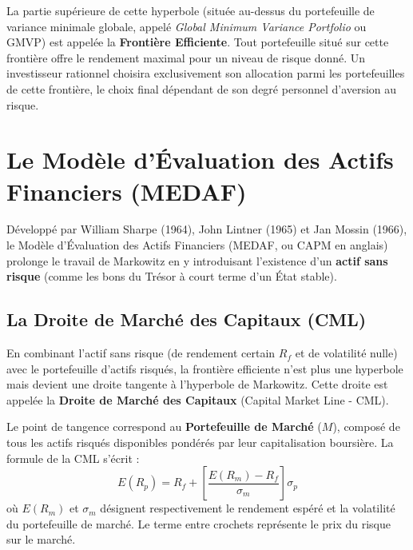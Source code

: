 La partie supérieure de cette hyperbole (située au-dessus du portefeuille de variance minimale globale, appelé \textit{Global Minimum Variance Portfolio} ou GMVP) est appelée la \textbf{Frontière Efficiente}. Tout portefeuille situé sur cette frontière offre le rendement maximal pour un niveau de risque donné. Un investisseur rationnel choisira exclusivement son allocation parmi les portefeuilles de cette frontière, le choix final dépendant de son degré personnel d'aversion au risque.

\section{Le Modèle d'Évaluation des Actifs Financiers (MEDAF)}
Développé par William Sharpe (1964), John Lintner (1965) et Jan Mossin (1966), le Modèle d'Évaluation des Actifs Financiers (MEDAF, ou CAPM en anglais) prolonge le travail de Markowitz en y introduisant l'existence d'un \textbf{actif sans risque} (comme les bons du Trésor à court terme d'un État stable).

\subsection{La Droite de Marché des Capitaux (CML)}
En combinant l'actif sans risque (de rendement certain $R_f$ et de volatilité nulle) avec le portefeuille d'actifs risqués, la frontière efficiente n'est plus une hyperbole mais devient une droite tangente à l'hyperbole de Markowitz. Cette droite est appelée la \textbf{Droite de Marché des Capitaux} (Capital Market Line - CML).

Le point de tangence correspond au \textbf{Portefeuille de Marché} ($M$), composé de tous les actifs risqués disponibles pondérés par leur capitalisation boursière. La formule de la CML s'écrit :
\begin{equation}
    E(R_p) = R_f + \left[ \frac{E(R_m) - R_f}{\sigma_m} \right] \sigma_p
\end{equation}
où $E(R_m)$ et $\sigma_m$ désignent respectivement le rendement espéré et la volatilité du portefeuille de marché. Le terme entre crochets représente le prix du risque sur le marché.

